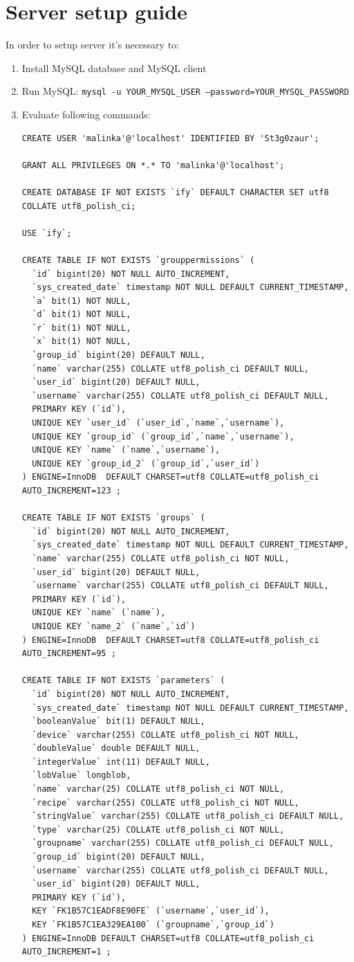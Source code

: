 \documentclass[11pt,a4paper,polish,thesis]{dcsbook}
\begin{document}
\chapter{Server setup guide}
In order to setup server it's necessary to:
\begin{enumerate}
\item Install MySQL database and MySQL client
\item Run MySQL: \texttt{mysql -u YOUR\_MYSQL\_USER --password=YOUR\_MYSQL\_PASSWORD}
\item Evaluate following commands:
\begin{verbatim}
CREATE USER 'malinka'@'localhost' IDENTIFIED BY 'St3g0zaur';

GRANT ALL PRIVILEGES ON *.* TO 'malinka'@'localhost';

CREATE DATABASE IF NOT EXISTS `ify` DEFAULT CHARACTER SET utf8 COLLATE utf8_polish_ci;

USE `ify`;

CREATE TABLE IF NOT EXISTS `grouppermissions` (
  `id` bigint(20) NOT NULL AUTO_INCREMENT,
  `sys_created_date` timestamp NOT NULL DEFAULT CURRENT_TIMESTAMP,
  `a` bit(1) NOT NULL,
  `d` bit(1) NOT NULL,
  `r` bit(1) NOT NULL,
  `x` bit(1) NOT NULL,
  `group_id` bigint(20) DEFAULT NULL,
  `name` varchar(255) COLLATE utf8_polish_ci DEFAULT NULL,
  `user_id` bigint(20) DEFAULT NULL,
  `username` varchar(255) COLLATE utf8_polish_ci DEFAULT NULL,
  PRIMARY KEY (`id`),
  UNIQUE KEY `user_id` (`user_id`,`name`,`username`),
  UNIQUE KEY `group_id` (`group_id`,`name`,`username`),
  UNIQUE KEY `name` (`name`,`username`),
  UNIQUE KEY `group_id_2` (`group_id`,`user_id`)
) ENGINE=InnoDB  DEFAULT CHARSET=utf8 COLLATE=utf8_polish_ci AUTO_INCREMENT=123 ;
 
CREATE TABLE IF NOT EXISTS `groups` (
  `id` bigint(20) NOT NULL AUTO_INCREMENT,
  `sys_created_date` timestamp NOT NULL DEFAULT CURRENT_TIMESTAMP,
  `name` varchar(255) COLLATE utf8_polish_ci NOT NULL,
  `user_id` bigint(20) DEFAULT NULL,
  `username` varchar(255) COLLATE utf8_polish_ci DEFAULT NULL,
  PRIMARY KEY (`id`),
  UNIQUE KEY `name` (`name`),
  UNIQUE KEY `name_2` (`name`,`id`)
) ENGINE=InnoDB  DEFAULT CHARSET=utf8 COLLATE=utf8_polish_ci AUTO_INCREMENT=95 ;
 
CREATE TABLE IF NOT EXISTS `parameters` (
  `id` bigint(20) NOT NULL AUTO_INCREMENT,
  `sys_created_date` timestamp NOT NULL DEFAULT CURRENT_TIMESTAMP,
  `booleanValue` bit(1) DEFAULT NULL,
  `device` varchar(255) COLLATE utf8_polish_ci NOT NULL,
  `doubleValue` double DEFAULT NULL,
  `integerValue` int(11) DEFAULT NULL,
  `lobValue` longblob,
  `name` varchar(25) COLLATE utf8_polish_ci NOT NULL,
  `recipe` varchar(255) COLLATE utf8_polish_ci NOT NULL,
  `stringValue` varchar(255) COLLATE utf8_polish_ci DEFAULT NULL,
  `type` varchar(25) COLLATE utf8_polish_ci NOT NULL,
  `groupname` varchar(255) COLLATE utf8_polish_ci DEFAULT NULL,
  `group_id` bigint(20) DEFAULT NULL,
  `username` varchar(255) COLLATE utf8_polish_ci DEFAULT NULL,
  `user_id` bigint(20) DEFAULT NULL,
  PRIMARY KEY (`id`),
  KEY `FK1B57C1EADF8E90FE` (`username`,`user_id`),
  KEY `FK1B57C1EA329EA100` (`groupname`,`group_id`)
) ENGINE=InnoDB DEFAULT CHARSET=utf8 COLLATE=utf8_polish_ci AUTO_INCREMENT=1 ;
 

\end{verbatim}
\end{enumerate}
\end{document}

